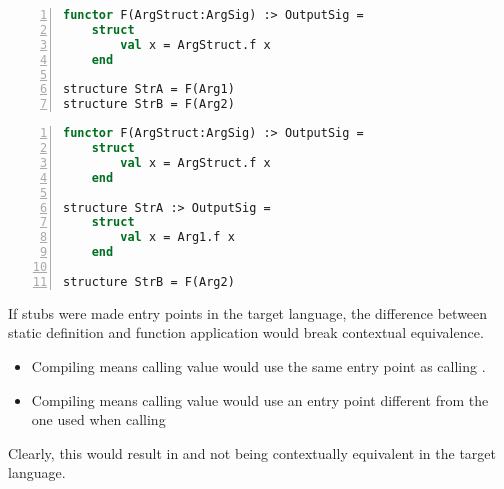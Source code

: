 \begin{lstlisting}[frame=single,numbers=left, language=ML, caption={[Functor Application or Static Definition: 1]Binding StrA and StrB using functor application.},
label=lst:FunctorApplicationOrStaticDefinition1, morekeywords={where}]
functor F(ArgStruct:ArgSig) :> OutputSig =
    struct
        val x = ArgStruct.f x
    end
    
structure StrA = F(Arg1)
structure StrB = F(Arg2)
\end{lstlisting}

\begin{lstlisting}[frame=single,numbers=left, language=ML, caption={[Functor Application or Static Definition: 2]Binding StrA and StrB using both static definition and functor application.},
label=lst:FunctorApplicationOrStaticDefinition2, morekeywords={where}]
functor F(ArgStruct:ArgSig) :> OutputSig =
    struct
        val x = ArgStruct.f x
    end
    
structure StrA :> OutputSig =
    struct
        val x = Arg1.f x
    end

structure StrB = F(Arg2)
\end{lstlisting}


If stubs were made entry points in the target language, the difference between static definition and function application would break contextual equivalence.
\begin{itemize}
\item Compiling  means calling value  would use the same entry point as calling .
\item Compiling  means calling value  would use an entry point different from the one used when calling 
\end{itemize}
Clearly, this would result in  and  not being contextually equivalent in the target language.


